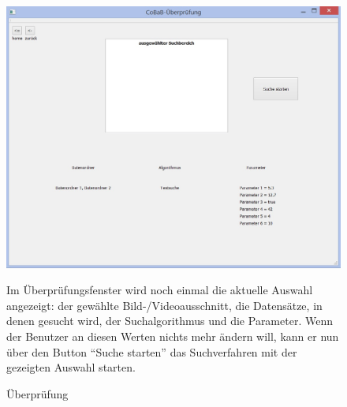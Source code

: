 \begin{figure}
\includegraphics[width=1\linewidth]{img/Ueberpruefung}
\caption{Überprüfung}
\label{fig:überprüfung}
\vspace{10pt}
Im Überprüfungsfenster wird noch einmal die aktuelle Auswahl angezeigt: der gewählte Bild-/Videoausschnitt, die Datensätze, in denen gesucht wird, der Suchalgorithmus und die Parameter. Wenn der Benutzer an diesen Werten nichts mehr ändern will, kann er nun über den Button \enquote{Suche starten} das Suchverfahren mit der gezeigten Auswahl starten.
\end{figure}


